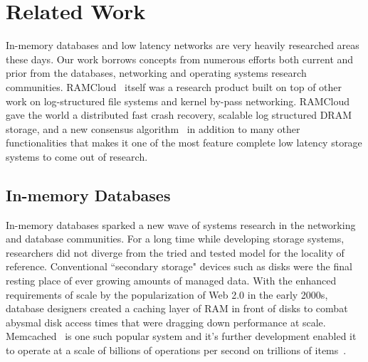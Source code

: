 
\chapter{Related Work}
\label{chap:relatedwork}

In-memory databases and low latency networks are very heavily researched areas
these days. Our work borrows concepts from numerous efforts both current and 
prior from the databases, networking and operating systems research communities.
RAMCloud~\cite{ramcloud} itself was a research product built on top of other 
work on log-structured file systems and kernel by-pass networking. RAMCloud gave the 
world a distributed fast crash recovery, scalable log structured DRAM storage, and a new consensus 
algorithm~\cite{ryan-thesis,ongaro2011fast,ramcloudfast,raft} in addition to many other 
functionalities that makes it one of the most feature complete low latency storage systems 
to come out of research.

\section{In-memory Databases}
In-memory databases sparked a new wave of systems research in the 
networking and database communities. For a long time while developing storage
systems, researchers did not diverge from the  tried and tested model for the 
locality of reference. Conventional ``secondary storage" devices
such as disks were the final resting place of ever growing amounts of managed data. With the 
enhanced requirements of scale by the popularization of Web 2.0 in the early 2000s, 
database designers created a caching layer of RAM in front of disks
to combat abysmal disk access times that were dragging down performance at scale. Memcached~\cite{memcached-orig}
is one such popular system and it's further development
enabled it to operate at a scale of billions of operations per second on trillions of items~\cite{nishtala2013scaling}.

